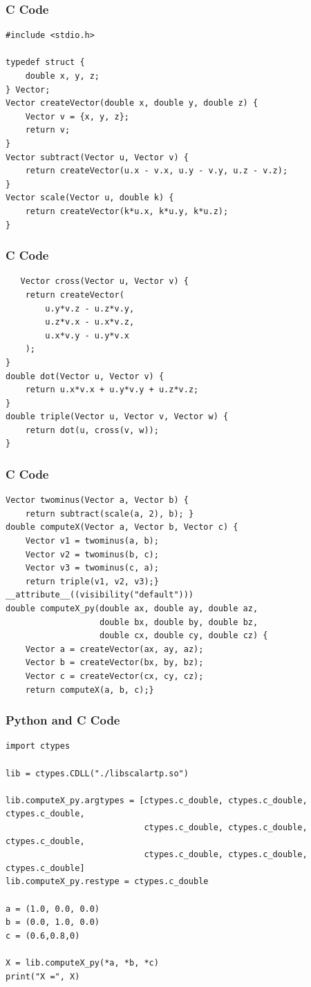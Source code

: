 \documentclass{beamer}
\begin{document}
\begin{frame}[fragile]
\frametitle{C Code}
\begin{lstlisting}
#include <stdio.h>

typedef struct {
    double x, y, z;
} Vector;
Vector createVector(double x, double y, double z) {
    Vector v = {x, y, z};
    return v;
}
Vector subtract(Vector u, Vector v) {
    return createVector(u.x - v.x, u.y - v.y, u.z - v.z);
}
Vector scale(Vector u, double k) {
    return createVector(k*u.x, k*u.y, k*u.z);
}
\end{lstlisting}

\end{frame}
\begin{frame}[fragile]
\frametitle{C Code}
\begin{lstlisting}
   Vector cross(Vector u, Vector v) {
    return createVector(
        u.y*v.z - u.z*v.y,
        u.z*v.x - u.x*v.z,
        u.x*v.y - u.y*v.x
    );
}
double dot(Vector u, Vector v) {
    return u.x*v.x + u.y*v.y + u.z*v.z;
}
double triple(Vector u, Vector v, Vector w) {
    return dot(u, cross(v, w));
}
\end{lstlisting}
\end{frame}
\begin{frame}[fragile]
\frametitle{C Code}
\begin{lstlisting}
Vector twominus(Vector a, Vector b) {
    return subtract(scale(a, 2), b); }
double computeX(Vector a, Vector b, Vector c) {
    Vector v1 = twominus(a, b);
    Vector v2 = twominus(b, c);
    Vector v3 = twominus(c, a);
    return triple(v1, v2, v3);}
__attribute__((visibility("default"))) 
double computeX_py(double ax, double ay, double az,
                   double bx, double by, double bz,
                   double cx, double cy, double cz) {
    Vector a = createVector(ax, ay, az);
    Vector b = createVector(bx, by, bz);
    Vector c = createVector(cx, cy, cz);
    return computeX(a, b, c);}
\end{lstlisting}

\end{frame}


\begin{frame}[fragile]
\frametitle{Python and C Code}

\begin{lstlisting}
import ctypes

lib = ctypes.CDLL("./libscalartp.so")

lib.computeX_py.argtypes = [ctypes.c_double, ctypes.c_double, ctypes.c_double,
                            ctypes.c_double, ctypes.c_double, ctypes.c_double,
                            ctypes.c_double, ctypes.c_double, ctypes.c_double]
lib.computeX_py.restype = ctypes.c_double

a = (1.0, 0.0, 0.0)
b = (0.0, 1.0, 0.0)
c = (0.6,0.8,0)

X = lib.computeX_py(*a, *b, *c)
print("X =", X)
\end{lstlisting}
\end{frame}
\end{document}
